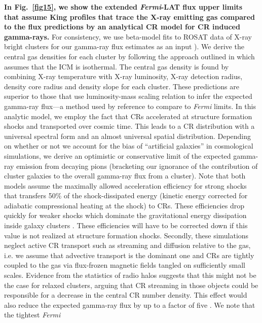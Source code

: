 \documentclass[10pt,aps,pra,reprint,amsmath,amsfonts,amssymb,showpacs,nofootinbib,floatfix]{revtex4-1}
\def\C#1{{\bf #1}}
\newcommand{\Fermi}{{\em Fermi}\xspace}
\begin{document}
\C{In Fig.~\ref{fig15}, we show the extended \Fermi-LAT flux upper
  limits that assume King profiles that trace the X-ray emitting gas
  compared to the flux predictions by an analytical CR model
  \cite{2010MNRAS.409..449P} for CR induced gamma-rays.} For
consistency, we use beta-model fits to ROSAT data of X-ray bright
clusters for our gamma-ray flux estimates as an input
\cite{2002ApJ...567..716R}). We derive the central gas densities for
each cluster by following the approach outlined in
\cite{1999ApJ...517..627M} which assumes that the ICM is
isothermal. The central gas density is found by combining X-ray
temperature with X-ray luminosity, X-ray detection radius, density
core radius and density slope for each cluster. These predictions are
superior to those that use luminosity-mass scaling relation to infer
the expected gamma-ray flux---a method used by reference
\cite{2010ApJ...717L..71A} to compare to \Fermi limits.  In this
analytic model, we employ the fact that CRs accelerated at structure
formation shocks and transported over cosmic time. This leads to a CR
distribution with a universal spectral form and an almost universal
spatial distribution. Depending on whether or not we account for the
bias of ``artificial galaxies'' in cosmological simulations, we derive
an optimistic or conservative limit of the expected gamma-ray emission
from decaying pions (bracketing our ignorance of the contribution of
cluster galaxies to the overall gamma-ray flux from a cluster). Note
that both models assume the maximally allowed acceleration efficiency
for strong shocks that transfers 50\% of the shock-dissipated energy
(kinetic energy corrected for adiabatic compressional heating at the
shock) to CRs. These efficiencies drop quickly for weaker shocks
\cite{2007A&A...473...41E} which dominate the gravitational energy
dissipation inside galaxy clusters \cite{2006MNRAS.367..113P}. These
efficiencies will have to be corrected down if this value is not
realized at structure formation shocks. Secondly, these simulations
neglect active CR transport such as streaming and diffusion relative
to the gas, i.e. we assume that advective transport is the dominant
one and CRs are tightly coupled to the gas via flux-frozen magnetic
fields tangled on sufficiently small scales. Evidence from the
statistics of radio halos suggests that this might not be the case for
relaxed clusters, arguing that CR streaming in those objects could be
responsible for a decrease in the central CR number density. This
effect would also reduce the expected gamma-ray flux by up to a factor
of five \cite{2011A&A...527A..99E}. We note that the tightest \Fermi
\end{document}
